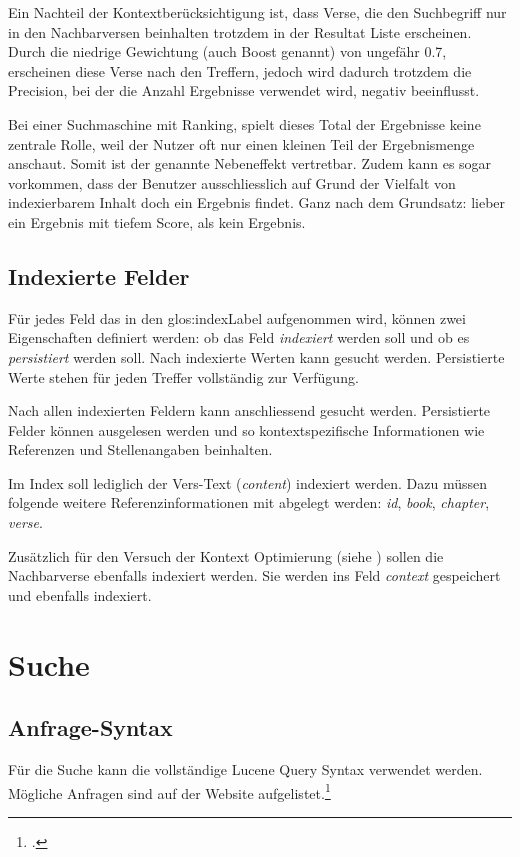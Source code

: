 Ein Nachteil der Kontextberücksichtigung ist, dass Verse, die den Suchbegriff nur in den Nachbarversen beinhalten trotzdem in der Resultat Liste erscheinen.
Durch die niedrige Gewichtung (auch Boost genannt) von ungefähr 0.7, erscheinen diese Verse nach den Treffern, jedoch wird dadurch trotzdem die Precision, bei der die Anzahl Ergebnisse verwendet wird, negativ beeinflusst.

Bei einer Suchmaschine mit Ranking, spielt dieses Total der Ergebnisse keine zentrale Rolle, weil der Nutzer oft nur einen kleinen Teil der Ergebnismenge anschaut.
Somit ist der genannte Nebeneffekt vertretbar.
Zudem kann es sogar vorkommen, dass der Benutzer ausschliesslich auf Grund der Vielfalt von indexierbarem Inhalt doch ein Ergebnis findet.
Ganz nach dem Grundsatz: lieber ein Ergebnis mit tiefem Score, als kein Ergebnis.


\subsection{Indexierte Felder}
Für jedes Feld das in den \gls{glos:indexLabel} aufgenommen wird, können zwei Eigenschaften definiert werden: ob das Feld \textit{indexiert} werden soll und ob es \textit{persistiert} werden soll.
Nach indexierte Werten kann gesucht werden. Persistierte Werte stehen für jeden Treffer vollständig zur Verfügung.

Nach allen indexierten Feldern kann anschliessend gesucht werden. Persistierte Felder können ausgelesen werden und so kontextspezifische Informationen wie Referenzen und Stellenangaben beinhalten.

Im Index soll lediglich der Vers-Text (\textit{content}) indexiert werden.
Dazu müssen folgende weitere Referenzinformationen mit abgelegt werden: \textit{id}, \textit{book}, \textit{chapter}, \textit{verse}.

Zusätzlich für den Versuch der Kontext Optimierung (siehe ) sollen die Nachbarverse ebenfalls indexiert werden. Sie werden ins Feld \textit{context} gespeichert und ebenfalls indexiert.


\section{Suche}
\subsection{Anfrage-Syntax}
Für die Suche kann die vollständige Lucene Query Syntax verwendet werden. Mögliche Anfragen sind auf der Website aufgelistet.\footcite{Lucene_Query_Syntax_Lucene_Tutorial_2016-05-09}

